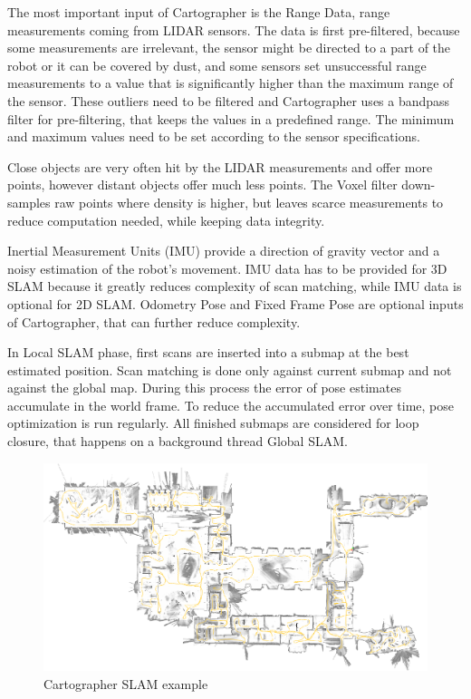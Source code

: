The most important input of Cartographer is the Range Data, range measurements coming from LIDAR sensors. The data is first 
pre-filtered, because some measurements are irrelevant, the sensor might be directed to a part of the robot or it can be covered
by dust, and some sensors set unsuccessful range measurements to a value that is significantly higher than the maximum range of 
the sensor. These outliers need to be filtered and Cartographer uses a bandpass filter for pre-filtering, that keeps the values
in a predefined range. The minimum and maximum values need to be set according to the sensor specifications. 

Close objects are very often hit by the LIDAR measurements and offer more points, however distant objects offer much less points.
The Voxel filter down-samples raw points where density is higher, but leaves scarce measurements to reduce computation needed,
while keeping data integrity.

Inertial Measurement Units (IMU) provide a direction of gravity vector and a noisy estimation of the robot's movement. IMU data
has to be provided for 3D SLAM because it greatly reduces complexity of scan matching, while IMU data is optional for 2D SLAM.
Odometry Pose and Fixed Frame Pose are optional inputs of Cartographer, that can further reduce complexity.

In Local SLAM phase, first scans are inserted into a submap at the best estimated position. Scan matching is done only against
current submap and not against the global map. During this process the error of pose estimates accumulate in the world frame. 
To reduce the accumulated error over time, pose optimization is run regularly. All finished submaps are considered for loop 
closure, that happens on a background thread Global SLAM.




\begin{figure}[!ht]
    \centering
	\includegraphics[width=140mm, keepaspectratio]{figures/cartographer_example.png}
    \caption{Cartographer SLAM example\cite{CartographerDocumentation}}
    \label{fig:cartographer_slam_example}
\end{figure}



